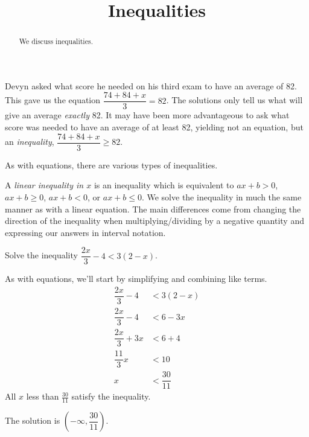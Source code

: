 \documentclass{ximera}
\title[Dig-In:]{Inequalities}
\begin{document}
\begin{abstract}
  We discuss inequalities.
\end{abstract}
\maketitle

Devyn asked what score he needed on his third exam to have an average of 82.  This gave us the equation $\displaystyle \dfrac{74 + 84 + x}{3} = 82$.  
The solutions only tell us what will give an average \emph{exactly} 82.  It may have been more advantageous to ask what score was needed to have an
average of at least 82, yielding not an equation, but an \emph{inequality}, $\displaystyle \dfrac{74+84+x}{3} \geq 82$.

As with equations, there are various types of inequalities.  

A \emph{linear inequality in $x$} is an inequality which is equivalent to  $ax + b >0$, $ax + b \geq 0$, $ax+b < 0$, or $ax + b \leq 0$.
We solve the inequality in much the same manner as with a linear equation.  The main differences come from changing the direction of the inequality when multiplying/dividing
by a negative quantity and expressing our answers in interval notation.

\begin{example}
 	Solve the inequality $\displaystyle \dfrac{2x}{3}-4 < 3\left( 2-x \right)$.
	\begin{explanation}
    		As with equations, we'll start by simplifying and combining like terms.
		\begin{align*}
			\dfrac{2x}{3} -4 &< 3\left( 2-x \right)\\
			\dfrac{2x}{3} - 4 &< 6 - 3x\\
			\dfrac{2x}{3}+3x &< 6 + 4\\
			\dfrac{11}{3} x &< 10\\
			x &< \dfrac{30}{11}
		\end{align*}
		All $x$ less than $\frac{30}{11}$ satisfy the inequality.
		
		The solution is $\left( -\infty , \dfrac{30}{11} \right)$.
	\end{explanation}
\end{example}
\end{document}
